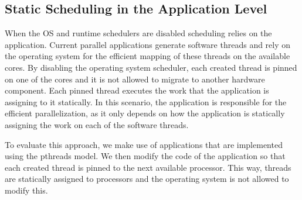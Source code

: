 \subsection{Static Scheduling in the Application Level}
When the OS and runtime schedulers are disabled scheduling relies on the application. 
Current parallel applications generate software threads and rely on the operating system for the efficient mapping of these threads on the available cores. 
By disabling the operating system scheduler, each created thread is pinned on one of the cores and it is not allowed to migrate to another hardware component. 
Each pinned thread executes the work that the application is assigning to it statically. 
In this scenario, the application is responsible for the efficient parallelization, as it only depends on how the application is statically assigning the work on each of the software threads. 


To evaluate this approach, we make use of applications that are implemented using the pthreads model. 
We then modify the code of the application so that each created thread is pinned to the next available processor.
This way, threads are statically assigned to processors and the operating system is not allowed to modify this.
%
%




